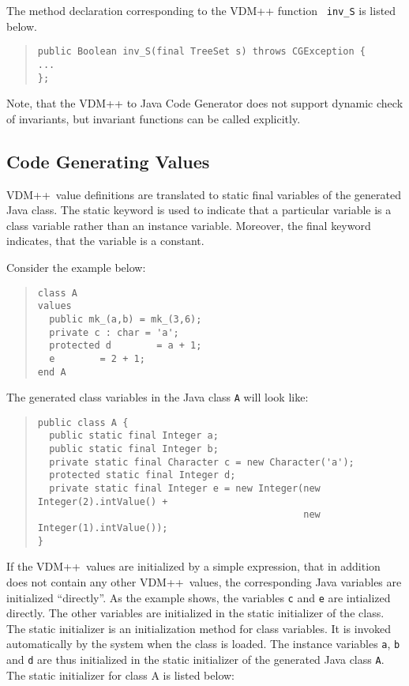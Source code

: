\documentclass[\pformat,11pt]{article}
\newcommand{\VDM}{VDM++}
\newcommand{\cg}{VDM++ to Java Code Generator}
\begin{document}
The method declaration corresponding to the \VDM{} function {\tt
  inv\_S} is listed below.

\begin{quote}
\begin{verbatim}
public Boolean inv_S(final TreeSet s) throws CGException {
...
};
\end{verbatim}
\end{quote}

Note, that the \cg{} does not support dynamic check of invariants, but
invariant functions can be called explicitly.

\subsection{Code Generating Values}
\label{values}

\VDM\ value definitions are translated to static final variables of
the generated Java class. The static keyword is used
to indicate that a particular variable is a class variable rather than
an instance variable. Moreover, the final keyword indicates, that the variable is a constant.

Consider the example below:

\begin{quote}
\begin{verbatim}
class A
values
  public mk_(a,b) = mk_(3,6);
  private c : char = 'a';
  protected d        = a + 1;
  e        = 2 + 1;
end A
\end{verbatim}
\end{quote}

The generated class variables in the Java class {\tt A} will look like:

\begin{quote}
\begin{small}
\begin{verbatim}
public class A {
  public static final Integer a;
  public static final Integer b;
  private static final Character c = new Character('a');
  protected static final Integer d;
  private static final Integer e = new Integer(new Integer(2).intValue() + 
                                               new Integer(1).intValue());
}
\end{verbatim}
\end{small}
\end{quote}

If the \VDM\ values are initialized by a simple expression, that in
addition does not contain any other \VDM\ values, the corresponding
Java variables are initialized ``directly''. As the example shows, the
variables {\tt c} and {\tt e} are intialized directly.  The other
variables are initialized in the static initializer of the class. The
static initializer is an initialization method for class variables. It
is invoked automatically by the system when the class is loaded.  The
instance variables {\tt a}, {\tt b} and {\tt d} are thus initialized
in the static initializer of the generated Java class {\tt A}.  The static
initializer for class A is listed below:
\end{document}

